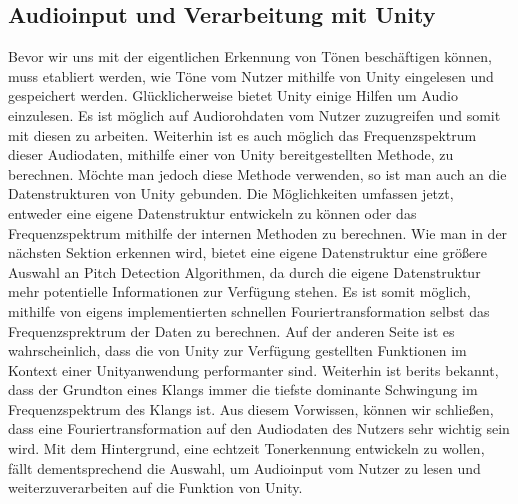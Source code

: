 \subsection{Audioinput und Verarbeitung mit Unity}
Bevor wir uns mit der eigentlichen Erkennung von Tönen beschäftigen können, muss etabliert werden, wie Töne vom Nutzer mithilfe von Unity eingelesen und gespeichert werden. Glücklicherweise bietet Unity einige Hilfen um Audio einzulesen. Es ist möglich auf Audiorohdaten vom Nutzer zuzugreifen und somit mit diesen zu arbeiten. Weiterhin ist es auch möglich das Frequenzspektrum dieser Audiodaten, mithilfe einer von Unity bereitgestellten Methode, zu berechnen. Möchte man jedoch diese Methode verwenden, so ist man auch an die Datenstrukturen von Unity gebunden. Die Möglichkeiten umfassen jetzt, entweder eine eigene Datenstruktur entwickeln zu können oder das Frequenzspektrum mithilfe der internen Methoden zu berechnen. Wie man in der nächsten Sektion erkennen wird, bietet eine eigene Datenstruktur eine größere Auswahl an Pitch Detection Algorithmen, da durch die eigene Datenstruktur mehr potentielle Informationen zur Verfügung stehen. Es ist somit möglich, mithilfe von eigens implementierten schnellen Fouriertransformation selbst das Frequenzsprektrum der Daten zu berechnen. Auf der anderen Seite ist es wahrscheinlich, dass die von Unity zur Verfügung gestellten Funktionen im Kontext einer Unityanwendung performanter sind. Weiterhin ist berits bekannt, dass der Grundton eines Klangs immer die tiefste dominante Schwingung im Frequenzspektrum des Klangs ist. Aus diesem Vorwissen, können wir schließen, dass eine Fouriertransformation auf den Audiodaten des Nutzers sehr wichtig sein wird. Mit dem Hintergrund, eine echtzeit Tonerkennung entwickeln zu wollen, fällt dementsprechend die Auswahl, um Audioinput vom Nutzer zu lesen und weiterzuverarbeiten auf die Funktion von Unity. 

